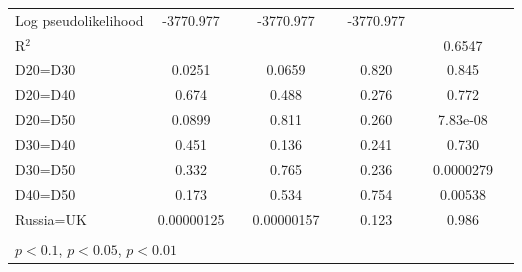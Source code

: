 \begin{tabular}{l|cccccc|cc}
Log pseudolikelihood  &  -3770.977  &         &      -3770.977             &         &        -3770.977           &         &           &   \\ 
R$^2$      &                  &         &                  &         &                  &         &    0.6547        &   \\ 
D20=D30         &   0.0251         &         &   0.0659         &         &    0.820         &         &    0.845         &         \\
D20=D40         &    0.674         &         &    0.488         &         &    0.276         &         &    0.772         &         \\
D20=D50         &   0.0899         &         &    0.811         &         &    0.260         &         & 7.83e-08         &         \\
D30=D40         &    0.451         &         &    0.136         &         &    0.241         &         &    0.730         &         \\
D30=D50         &    0.332         &         &    0.765         &         &    0.236         &         &0.0000279         &         \\
D40=D50         &    0.173         &         &    0.534         &         &    0.754         &         &  0.00538         &         \\
Russia=UK       &0.00000125         &         &0.00000157         &         &    0.123         &         &    0.986         &         \\
\hline\hline
\multicolumn{9}{p{16cm}}{\tiny }\\
\multicolumn{9}{l}{\tiny \sym{*} \(p<0.1\), \sym{**} \(p<0.05\), \sym{***} \(p<0.01\)}\\
\end{tabular}